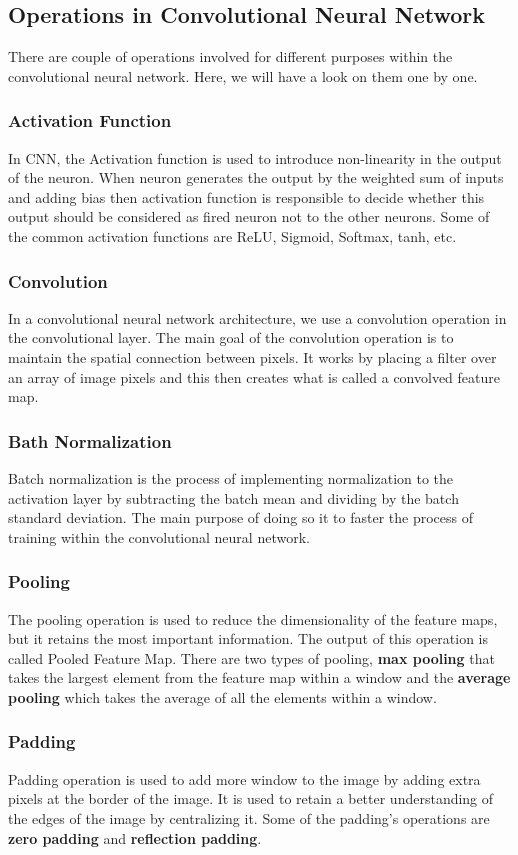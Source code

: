 \subsection{Operations in Convolutional Neural Network}
There are couple of operations involved for different purposes within the convolutional neural network. Here, we will have a look on them one by one.
\subsubsection{Activation Function}
In CNN, the Activation function \cite{activation_func} is used to introduce non-linearity in the output of the neuron. When neuron generates the output by the weighted sum of inputs and adding bias then activation function is responsible to decide whether this output should be considered as fired neuron not to the other neurons. Some of the common activation functions are ReLU, Sigmoid, Softmax, tanh, etc.
\subsubsection{Convolution}
In a convolutional neural network architecture, we use a convolution operation in the convolutional layer. The main goal of the convolution operation is to maintain the spatial connection between pixels. It works by placing a filter over an array of image pixels and this then creates what is called a convolved feature map.
\subsubsection{Bath Normalization}
Batch normalization is the process of implementing normalization to the activation layer by subtracting the batch mean and dividing by the batch standard deviation. The main purpose of doing so it to faster the process of training within the convolutional neural network.
\subsubsection{Pooling}
The pooling operation is used to reduce the dimensionality of the feature maps, but it retains the most important information. The output of this operation is called Pooled Feature Map. There are two types of pooling, \textbf{max pooling} that takes the largest element from the feature map within a window and the \textbf{average pooling} which takes the average of all the elements within a window.
\subsubsection{Padding}
Padding operation is used to add more window to the image by adding extra pixels at the border of the image. It is used to retain a better understanding of the edges of the image by centralizing it. Some of the padding's operations are \textbf{zero padding} and \textbf{reflection padding}. 
